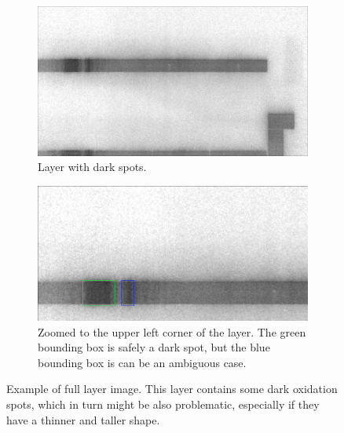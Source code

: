 \begin{figure}[ht]
  \centering

  \begin{subfigure}{0.85\textwidth}
    \includegraphics[width=\textwidth]{images/layer_dark_scratch}
    \caption{Layer with dark spots.}

  \end{subfigure}

  \begin{subfigure}{0.85\textwidth}
    \includegraphics[width=\textwidth]{images/layer_dark_scratch_cropped}
    \caption{Zoomed to the upper left corner of the layer. The green bounding box is safely a dark spot, but the blue bounding box is can be an ambiguous case.}
  \end{subfigure}

  \caption{Example of full layer image. This layer contains some dark oxidation spots, which in turn might be also problematic, especially if they have a thinner and taller shape.}
  \label{intro:layer_oxidation}


\end{figure}
